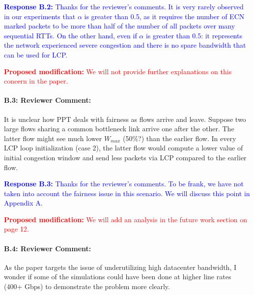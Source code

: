 \documentclass[12pt,one-column]{article}
\begin{document}
\noindent\textcolor{blue}{\textbf{Response B.2:}
Thanks for the reviewer’s comments. 
It is very rarely observed in our experiments that $\alpha$ is greater than 0.5, as it requires the number of ECN marked packets to be more than half of the number of all packets over many sequential RTTs.
On the other hand, even if $\alpha$ is greater than 0.5: it represents the network experienced severe congestion and there is no spare bandwidth that can be used for LCP.
}

\noindent\textcolor{red}{\textbf{Proposed modification: }
We will not provide further explanations on this concern in the paper.
}

{\it \paragraph{B.3: Reviewer Comment:} It is unclear how PPT deals with fairness as flows arrive and leave. Suppose two large flows sharing a common bottleneck link arrive one after the other. The latter flow might see much lower $W_{max}$ (50\%?) than the earlier flow. In every LCP loop initialization (case 2), the latter flow would compute a lower value of initial congestion window and send less packets via LCP compared to the earlier flow.}



\noindent\textcolor{blue}{\textbf{Response B.3:}
Thanks for the reviewer’s comments. 
To be frank, we have not taken into account the fairness issue in this scenario.
We will discuss this point in Appendix A.
}

\noindent\textcolor{red}{\textbf{Proposed modification: }
We will add an analysis in the future work section on page 12.
}

{\it \paragraph{B.4: Reviewer Comment:} As the paper targets the issue of underutilizing high datacenter bandwidth, I wonder if some of the simulations could have been done at higher line rates (400+ Gbps) to demonstrate the problem more clearly.}
\end{document}
